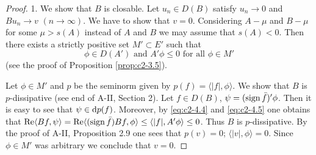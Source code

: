 \begin{proof}
1. We show that $B$ is closable.
Let $u_{n} \in D(B)$ satisfy $u_{n} \to 0$ and $Bu_{n} \to v$ $(n \to \infty)$.
We have to
show that $v = 0$. 
Considering $A - \mu$ and $B - \mu$ for some $\mu > s(A)$ instead of $A$ and $B$ we may assume that $s(A) < 0$. 
Then there exists a strictly positive set $M' \subset E'$ such that
\begin{equation}\label{eq:c2-4.5}
\phi \in D(A') \text{ and } A'\phi \leq 0 \text{ for all } \phi \in M'
\end{equation}
(see the proof of Proposition \ref{prop:c2-3.5}).

Let $\phi \in M'$ and $p$ be the seminorm given by $p(f) = \langle|f|,\phi\rangle$. 
We show that $B$ is $p$-dissipative (see end of A-II, Section 2).
Let $f \in D(B)$, $\psi = (\operatorname{sign}  \bar{f})'\phi$. 
Then it is easy to see that $\psi \in \mathop{}\!\mathrm{d}{p}(f)$. 
Moreover, by \eqref{eq:c2-4.4} and \eqref{eq:c2-4.5} one obtains that 
$\mathop{}\!\mathrm{Re}\langle Bf,\psi\rangle = \mathop{}\!\mathrm{Re}\langle(\operatorname{sign}  \bar{f})Bf,\phi\rangle \leq \langle|f|,A'\phi\rangle \leq 0$. 
Thus $B$ is $p$-dissipative. 
By the proof of A-II, Proposition 2.9 
one sees that $p(v) = 0$; \ie $\langle|v|,\phi\rangle = 0$.
Since $\phi \in M'$ was arbitrary we conclude that $v = 0$.


\end{proof}
